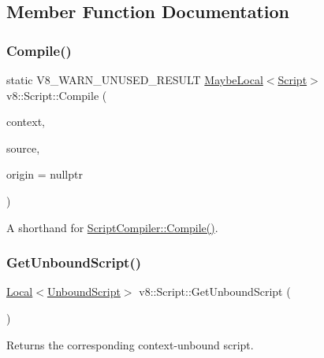 \subsection{Member Function Documentation}
\mbox{\label{classv8_1_1Script_a1793e3022a87f5a574df10bff8b42762}} 
\subsubsection{\texorpdfstring{Compile()}{Compile()}}
{\footnotesize\ttfamily static V8\+\_\+\+W\+A\+R\+N\+\_\+\+U\+N\+U\+S\+E\+D\+\_\+\+R\+E\+S\+U\+LT \mbox{\hyperlink{classv8_1_1MaybeLocal}{Maybe\+Local}}$<$\mbox{\hyperlink{classv8_1_1Script}{Script}}$>$ v8\+::\+Script\+::\+Compile (\begin{DoxyParamCaption}\item[{\mbox{\hyperlink{classv8_1_1Local}{Local}}$<$ Context $>$}]{context,  }\item[{\mbox{\hyperlink{classv8_1_1Local}{Local}}$<$ \mbox{\hyperlink{classv8_1_1String}{String}} $>$}]{source,  }\item[{\mbox{\hyperlink{classv8_1_1ScriptOrigin}{Script\+Origin}} $\ast$}]{origin = {\ttfamily nullptr} }\end{DoxyParamCaption})\hspace{0.3cm}{\ttfamily [static]}}

A shorthand for \mbox{\hyperlink{classv8_1_1ScriptCompiler_a217bcf520f4ed70f6f02afeabfe60319}{Script\+Compiler\+::\+Compile()}}. \mbox{\label{classv8_1_1Script_afac25cad452a61897c375c2b881e2070}} 
\subsubsection{\texorpdfstring{Get\+Unbound\+Script()}{GetUnboundScript()}}
{\footnotesize\ttfamily \mbox{\hyperlink{classv8_1_1Local}{Local}}$<$\mbox{\hyperlink{classv8_1_1UnboundScript}{Unbound\+Script}}$>$ v8\+::\+Script\+::\+Get\+Unbound\+Script (\begin{DoxyParamCaption}{ }\end{DoxyParamCaption})}

Returns the corresponding context-\/unbound script. \mbox{\label{classv8_1_1Script_a37cfd598569f8b502d568a8a7a5a319b}} 
